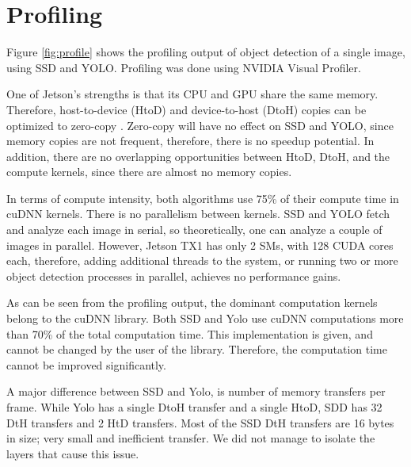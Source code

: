 \section{Profiling}
\label{sec:profiling}

Figure \ref{fig:profile} shows the profiling output of object detection of a single image, using SSD and YOLO. Profiling was done using NVIDIA Visual Profiler.

One of Jetson's strengths is that its CPU and GPU share the same memory. Therefore, host-to-device (HtoD) and device-to-host (DtoH) copies can be optimized to zero-copy \cite{tegrazerocopy}. Zero-copy will have no effect on SSD and YOLO, since memory copies are not frequent, therefore, there is no speedup potential. In addition, there are no overlapping opportunities between HtoD, DtoH, and the compute kernels, since there are almost no memory copies.

In terms of compute intensity, both algorithms use 75\% of their compute time in cuDNN kernels. There is no parallelism between kernels. SSD and YOLO fetch and analyze each image in serial, so theoretically, one can analyze a couple of images in parallel. However, Jetson TX1 has only 2 SMs, with 128 CUDA cores each, therefore, adding additional threads to the system, or running two or more object detection processes in parallel, achieves no performance gains.

As can be seen from the profiling output, the dominant computation kernels belong to the cuDNN library. Both SSD and Yolo use cuDNN computations more than 70\% of the total computation time. This implementation is given, and cannot be changed by the user of the library. Therefore, the computation time cannot be improved significantly.

A major difference between SSD and Yolo, is number of memory transfers per frame. While Yolo has a single DtoH transfer and a single HtoD, SDD has 32 DtH transfers and 2 HtD transfers. Most of the SSD DtH transfers are 16 bytes in size; very small and inefficient transfer. We did not manage to isolate the layers that cause this issue.  



